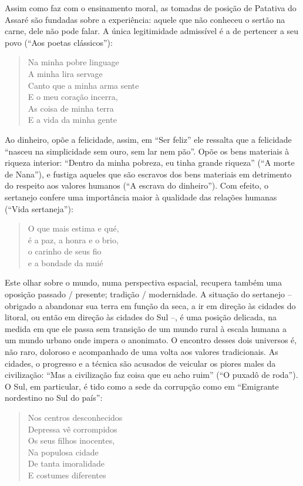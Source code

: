 Assim como faz com o ensinamento moral, as tomadas de posição de Patativa do
Assaré são fundadas sobre a experiência: aquele que não conheceu o sertão na
carne, dele não pode falar. A única legitimidade admissível é a de pertencer a
seu povo (“Aos poetas clássicos”):

\begin{verse}
Na minha pobre linguage \\
A minha lira servage \\
Canto que a minha arma sente \\
E o meu coração incerra, \\
As coisa de minha terra \\
E a vida da minha gente 
\end{verse}

Ao dinheiro, opõe a felicidade, assim, em “Ser feliz” ele ressalta que a
felicidade “nasceu na simplicidade sem ouro, sem lar nem pão”. Opõe os bens
materiais à riqueza interior: “Dentro da minha pobreza, eu tinha grande riqueza”
(“A morte de Nana”), e fustiga aqueles que são escravos dos bens materiais em
detrimento do respeito aos valores humanos (“A escrava do dinheiro”). Com
efeito, o sertanejo confere uma importância maior à qualidade das relações
humanas (“Vida sertaneja”): 

\begin{verse}
O que mais estima e qué, \\
é a paz, a honra e o brio, \\
o carinho de seus fio \\
e a bondade da muié
\end{verse}

Este olhar sobre o mundo, numa perspectiva espacial, recupera também uma
oposição passado / presente; tradição / modernidade. A situação do sertanejo --
obrigado a abandonar sua terra em função da seca, a ir em direção às cidades do
litoral, ou então em direção às cidades do Sul --, é uma posição delicada, na
medida em que ele passa sem transição de um mundo rural à escala humana a um
mundo urbano onde impera o anonimato. O encontro desses dois universos é, não
raro, doloroso e acompanhado de uma volta aos valores tradicionais. As cidades,
o progresso e a técnica são acusados de veicular os piores males da civilização:
“Mas a civilização faz coisa que eu acho ruim” (“O puxadô de roda”). O Sul, em
particular, é tido como a sede da corrupção como em “Emigrante nordestino no Sul
do país”: 

\begin{verse}
Nos centros desconhecidos \\
Depressa vê corrompidos \\
Os seus filhos inocentes, \\
Na populosa cidade \\
De tanta imoralidade \\
E costumes diferentes
\end{verse}

